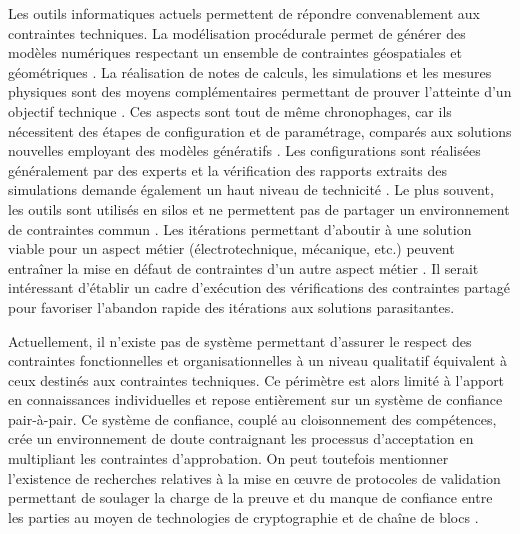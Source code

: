 \documentclass[a4paper,12pt]{article}
\begin{document}
Les outils informatiques actuels permettent de répondre convenablement aux contraintes techniques. La modélisation procédurale permet de générer des modèles numériques respectant un ensemble de contraintes géospatiales et géométriques \autocite{s.dineshkumarBIMbasedAutomatedSite2015}. La réalisation de notes de calculs, les simulations et les mesures physiques sont des moyens complémentaires permettant de prouver l’atteinte d’un objectif technique \autocite{tomc.borstBIMSimulation2015,galSimulationEnergetiqueDynamique2025a}. Ces aspects sont tout de même chronophages, car ils nécessitent des étapes de configuration et de paramétrage, comparés aux solutions nouvelles employant des modèles génératifs \autocite{chaillouLintelligenceArtificielleAu2021a}. Les configurations sont réalisées généralement par des experts et la vérification des rapports extraits des simulations demande également un haut niveau de technicité \autocite{delsavioVirtualDesignConstruction2022}. Le plus souvent, les outils sont utilisés en silos et ne permettent pas de partager un environnement de contraintes commun \autocite{moreauConceptionElectriqueQuelles2019a}. Les itérations permettant d’aboutir à une solution viable pour un aspect métier (électrotechnique, mécanique, etc.) peuvent entraîner la mise en défaut de contraintes d’un autre aspect métier \autocite{vandebrugInterdisciplinaryConfigurationMethods2025a}. Il serait intéressant d’établir un cadre d'exécution des vérifications des contraintes partagé pour favoriser l’abandon rapide des itérations aux solutions parasitantes.

Actuellement, il n'existe pas de système permettant d’assurer le respect des contraintes fonctionnelles et organisationnelles à un niveau qualitatif équivalent à ceux destinés aux contraintes techniques. Ce périmètre est alors limité à l'apport en connaissances individuelles et repose entièrement sur un système de confiance pair-à-pair. Ce système de confiance, couplé au cloisonnement des compétences, crée un environnement de doute contraignant les processus d'acceptation en multipliant les contraintes d’approbation. On peut toutefois mentionner l’existence de recherches relatives à la mise en œuvre de protocoles de validation permettant de soulager la charge de la preuve et du manque de confiance entre les parties au moyen de technologies de cryptographie et de chaîne de blocs \autocite{mathewsBIM+BlockchainSolutionTrust2017a}. 
\end{document}
